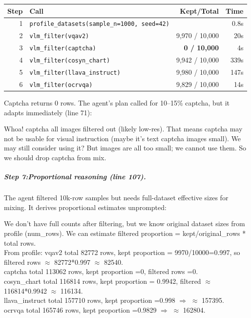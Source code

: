 \begin{toolaction}[title={Tool Calls}]
\scriptsize
\begin{tabular}{@{}rlrr@{}}
\toprule
\textbf{Step} & \textbf{Call} & \textbf{Kept/Total} & \textbf{Time} \\
\midrule
1 & \texttt{profile\_datasets(sample\_n=1000, seed=42)} & & 0.8s \\
2 & \texttt{vlm\_filter(vqav2)} & 9{,}970 / 10{,}000 & 20s \\
3 & \texttt{vlm\_filter(captcha)} & \textbf{0 / 10{,}000} & 4s \\
4 & \texttt{vlm\_filter(cosyn\_chart)} & 9{,}942 / 10{,}000 & 339s \\
5 & \texttt{vlm\_filter(llava\_instruct)} & 9{,}980 / 10{,}000 & 147s \\
6 & \texttt{vlm\_filter(ocrvqa)} & 9{,}829 / 10{,}000 & 14s \\
\bottomrule
\end{tabular}
\end{toolaction}

\noindent Captcha returns 0 rows. The agent's plan called for 10--15\% captcha, but it adapts immediately (line 71):

\begin{agentthought}[title={Agent Thought:data-driven plan revision}]
\small\ttfamily
Whoa! captcha all images filtered out (likely low-res). That means captcha may not be usable for visual instruction (maybe it's text captcha images small). We may still consider using it? But images are all too small; we cannot use them. So we should drop captcha from mix.
\end{agentthought}

\subparagraph{Step 7:Proportional reasoning (line 107).}
The agent filtered 10k-row samples but needs full-dataset effective sizes for mixing. It derives proportional estimates unprompted:

\begin{agentthought}[title={Agent Thought:quantitative reasoning}]
\small\ttfamily
We don't have full counts after filtering, but we know original dataset sizes from profile (num\_rows). We can estimate filtered proportion = kept/original\_rows * total rows.\\[4pt]
From profile: vqav2 total 82772 rows, kept proportion = 9970/10000=0.997, so filtered rows \ensuremath{\approx} 82772*0.997 \ensuremath{\approx} 82540.\\
captcha total 113062 rows, kept proportion =0, filtered rows =0.\\
cosyn\_chart total 116814 rows, kept proportion = 0.9942, filtered \ensuremath{\approx} 116814*0.9942 \ensuremath{\approx} 116134.\\
llava\_instruct total 157710 rows, kept proportion =0.998 \ensuremath{\Rightarrow} \ensuremath{\approx} 157395.\\
ocrvqa total 165746 rows, kept proportion =0.9829 \ensuremath{\Rightarrow} \ensuremath{\approx} 162804.
\end{agentthought}

